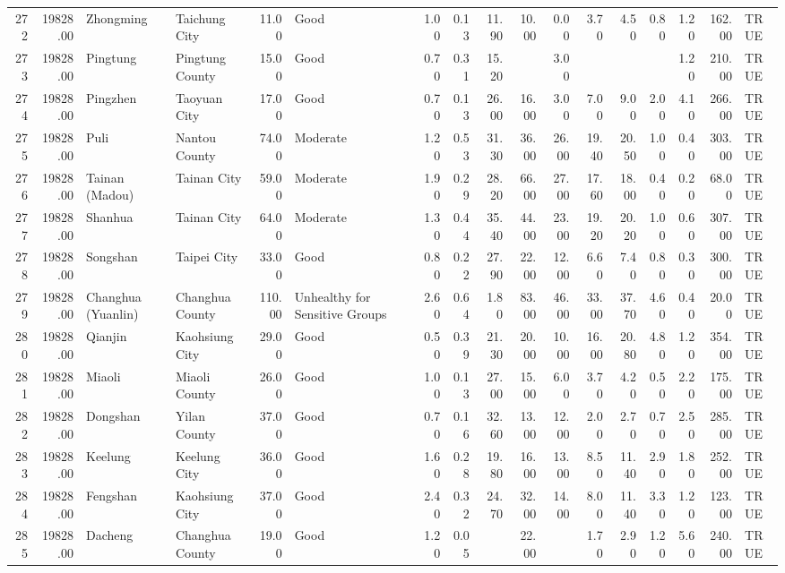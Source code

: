 \begin{table}[ht]
\begin{tabular}{rrllrlrrrrrrrrrrl}
  272 & 19828.00 & Zhongming & Taichung City & 11.00 & Good & 1.00 & 0.13 & 11.90 & 10.00 & 0.00 & 3.70 & 4.50 & 0.80 & 1.20 & 162.00 & TRUE \\ 
  273 & 19828.00 & Pingtung & Pingtung County & 15.00 & Good & 0.70 & 0.31 & 15.20 &  & 3.00 &  &  &  & 1.20 & 210.00 & TRUE \\ 
  274 & 19828.00 & Pingzhen & Taoyuan City & 17.00 & Good & 0.70 & 0.13 & 26.00 & 16.00 & 3.00 & 7.00 & 9.00 & 2.00 & 4.10 & 266.00 & TRUE \\ 
  275 & 19828.00 & Puli & Nantou County & 74.00 & Moderate & 1.20 & 0.53 & 31.30 & 36.00 & 26.00 & 19.40 & 20.50 & 1.00 & 0.40 & 303.00 & TRUE \\ 
  276 & 19828.00 & Tainan (Madou) & Tainan City & 59.00 & Moderate & 1.90 & 0.29 & 28.20 & 66.00 & 27.00 & 17.60 & 18.00 & 0.40 & 0.20 & 68.00 & TRUE \\ 
  277 & 19828.00 & Shanhua & Tainan City & 64.00 & Moderate & 1.30 & 0.44 & 35.40 & 44.00 & 23.00 & 19.20 & 20.20 & 1.00 & 0.60 & 307.00 & TRUE \\ 
  278 & 19828.00 & Songshan & Taipei City & 33.00 & Good & 0.80 & 0.22 & 27.90 & 22.00 & 12.00 & 6.60 & 7.40 & 0.80 & 0.30 & 300.00 & TRUE \\ 
  279 & 19828.00 & Changhua (Yuanlin) & Changhua County & 110.00 & Unhealthy for Sensitive Groups & 2.60 & 0.64 & 1.80 & 83.00 & 46.00 & 33.00 & 37.70 & 4.60 & 0.40 & 20.00 & TRUE \\ 
  280 & 19828.00 & Qianjin & Kaohsiung City & 29.00 & Good & 0.50 & 0.39 & 21.30 & 20.00 & 10.00 & 16.00 & 20.80 & 4.80 & 1.20 & 354.00 & TRUE \\ 
  281 & 19828.00 & Miaoli & Miaoli County & 26.00 & Good & 1.00 & 0.13 & 27.00 & 15.00 & 6.00 & 3.70 & 4.20 & 0.50 & 2.20 & 175.00 & TRUE \\ 
  282 & 19828.00 & Dongshan & Yilan County & 37.00 & Good & 0.70 & 0.16 & 32.60 & 13.00 & 12.00 & 2.00 & 2.70 & 0.70 & 2.50 & 285.00 & TRUE \\ 
  283 & 19828.00 & Keelung & Keelung City & 36.00 & Good & 1.60 & 0.28 & 19.80 & 16.00 & 13.00 & 8.50 & 11.40 & 2.90 & 1.80 & 252.00 & TRUE \\ 
  284 & 19828.00 & Fengshan & Kaohsiung City & 37.00 & Good & 2.40 & 0.32 & 24.70 & 32.00 & 14.00 & 8.00 & 11.40 & 3.30 & 1.20 & 123.00 & TRUE \\ 
  285 & 19828.00 & Dacheng & Changhua County & 19.00 & Good & 1.20 & 0.05 &  & 22.00 &  & 1.70 & 2.90 & 1.20 & 5.60 & 240.00 & TRUE \\ 

\end{tabular}
\end{table}
